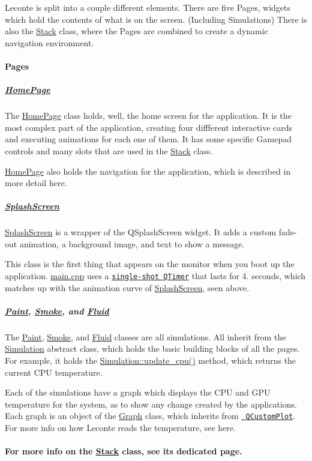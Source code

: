 Leconte is split into a couple different elements. There are five Pages, widgets which hold the contents of what is on the screen. (Including Simulations) There is also the \mbox{\hyperlink{classStack}{Stack}} class, where the Pages are combined to create a dynamic navigation environment.

\paragraph*{Pages}

\subparagraph*{\mbox{\hyperlink{classHomePage}{Home\+Page}}}

The \mbox{\hyperlink{classHomePage}{Home\+Page}} class holds, well, the home screen for the application. It is the most complex part of the application, creating four diffferent interactive cards and executing animations for each one of them. It has some specific Gamepad controls and many slots that are used in the \mbox{\hyperlink{classStack}{Stack}} class.

\mbox{\hyperlink{classHomePage}{Home\+Page}} also holds the navigation for the application, which is described in more detail here.

\subparagraph*{\mbox{\hyperlink{classSplashScreen}{Splash\+Screen}}}

\mbox{\hyperlink{classSplashScreen}{Splash\+Screen}} is a wrapper of the Q\+Splash\+Screen widget. It adds a custom fade-\/out animation, a background image, and text to show a message.

This class is the first thing that appears on the monitor when you boot up the application. {\ttfamily \mbox{\hyperlink{main_8cpp}{main.\+cpp}}} uses a \href{https://doc.qt.io/qt-5/qtimer.html\#singleShot}{\texttt{ {\ttfamily single-\/shot Q\+Timer}}} that lasts for 4. seconds, which matches up with the animation curve of \mbox{\hyperlink{classSplashScreen}{Splash\+Screen}}, seen above.

\subparagraph*{\mbox{\hyperlink{classPaint}{Paint}}, \mbox{\hyperlink{classSmoke}{Smoke}}, and \mbox{\hyperlink{classFluid}{Fluid}}}

The \mbox{\hyperlink{classPaint}{Paint}}, \mbox{\hyperlink{classSmoke}{Smoke}}, and \mbox{\hyperlink{classFluid}{Fluid}} classes are all simulations. All inherit from the \mbox{\hyperlink{classSimulation}{Simulation}} abstract class, which holds the basic building blocks of all the pages. For example, it holds the {\ttfamily \mbox{\hyperlink{classSimulation_a36aefdee44fabe9b8070363ca9eb80a7}{Simulation\+::update\+\_\+cpu()}}} method, which returns the current C\+PU temperature.

Each of the simulations have a graph which displays the C\+PU and G\+PU temperature for the system, as to show any change created by the applications. Each graph is an object of the \mbox{\hyperlink{classGraph}{Graph}} class, which inherits from \href{https://www.qcustomplot.com/}{\texttt{ Q\+Custom\+Plot}}. For more info on how Leconte reads the temperature, see here.

\paragraph*{For more info on the \mbox{\hyperlink{classStack}{Stack}} class, see it\textquotesingle{}s dedicated page.}